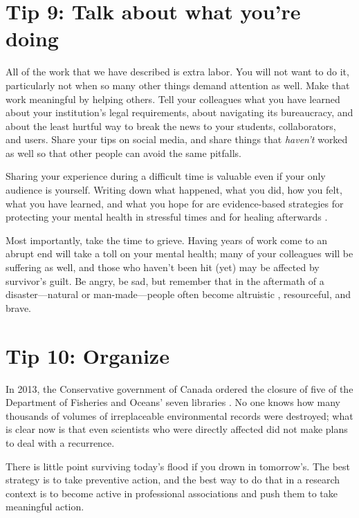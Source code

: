 \documentclass[10pt,letterpaper]{article}
\begin{document}
\section*{Tip 9: Talk about what you're doing}

All of the work that we have described is extra labor.
You will not want to do it, particularly not when so many other things demand attention as well.
Make that work meaningful by helping others.
Tell your colleagues what you have learned about your institution's legal requirements, about navigating its bureaucracy,
and about the least hurtful way to break the news to your students, collaborators, and users.
Share your tips on social media, and share things that \emph{haven't} worked as well so that other people can avoid the same pitfalls.

Sharing your experience during a difficult time is valuable even if your only audience is yourself.
Writing down what happened, what you did, how you felt, what you have learned, and what you hope for
are evidence-based strategies for protecting your mental health in stressful times
and for healing afterwards \cite{Pennebaker2016, Cullen2022}.

Most importantly, take the time to grieve.
Having years of work come to an abrupt end will take a toll on your mental health; many of your colleagues will be suffering as well, and those who haven't been hit (yet) may be affected by survivor's guilt.
Be angry, be sad, but remember that in the aftermath of a disaster---natural or man-made---people often become altruistic \cite{Yang2024}, resourceful, and brave.

\section*{Tip 10: Organize}

In 2013, the Conservative government of Canada ordered the closure of five of the Department of Fisheries and Oceans' seven libraries \cite{Nikiforuk2013}.
No one knows how many thousands of volumes of irreplaceable environmental records were destroyed; what is clear now is that even scientists who were directly affected did not make plans to deal with a recurrence.

There is little point surviving today's flood if you drown in tomorrow's. The best strategy is to take preventive action, and the best way to do that in a research context is to become active in professional associations and push them to take meaningful action.
\end{document}

